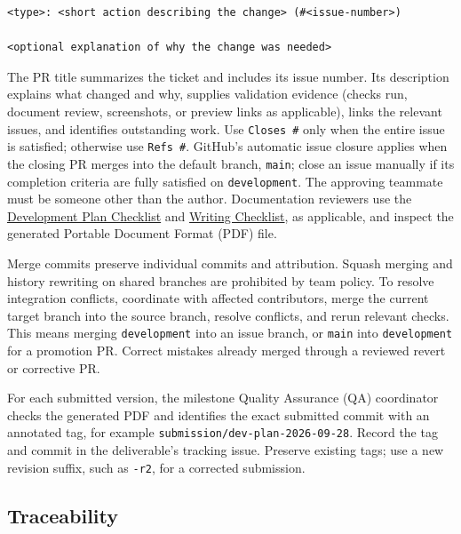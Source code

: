 \documentclass{article}
\begin{document}
\begin{verbatim}
<type>: <short action describing the change> (#<issue-number>)

<optional explanation of why the change was needed>
\end{verbatim}

The PR title summarizes the ticket and includes its issue number. Its
description explains what changed and why, supplies validation evidence
(checks run, document review, screenshots, or preview links as applicable),
links the relevant issues, and identifies outstanding work. Use
\texttt{Closes \#<issue-number>} only when the entire issue is satisfied; otherwise use
\texttt{Refs \#<issue-number>}. GitHub's automatic issue closure applies when
the closing PR merges into the default branch, \texttt{main}; close an issue
manually if its completion criteria are fully satisfied on \texttt{development}.
The approving teammate must be someone other than the
author. Documentation reviewers use the
\href{https://github.com/AHMEDELZARIA/squigglr/blob/main/docs/Checklists/DevPlan-Checklist.tex}
{Development Plan Checklist} and
\href{https://github.com/AHMEDELZARIA/squigglr/blob/main/docs/Checklists/Writing-Checklist.tex}
{Writing Checklist}, as applicable, and inspect the generated
Portable Document Format (PDF) file.

Merge commits preserve individual commits and attribution. Squash merging
and history rewriting on shared branches are prohibited by team policy.
To resolve integration conflicts, coordinate with affected contributors,
merge the current target branch into the source branch, resolve conflicts,
and rerun relevant checks. This means merging \texttt{development} into an
issue branch, or \texttt{main} into \texttt{development} for a promotion PR.
Correct mistakes already merged through a reviewed revert or corrective PR.

For each submitted version, the milestone Quality Assurance (QA) coordinator
checks the generated PDF and identifies the exact submitted commit with an
annotated tag, for example \texttt{submission/dev-plan-2026-09-28}. Record the
tag and commit in the deliverable's tracking issue. Preserve existing tags;
use a new revision suffix, such as \texttt{-r2}, for a corrected submission.

\subsection{Traceability}
\label{sec:traceability}
\end{document}
